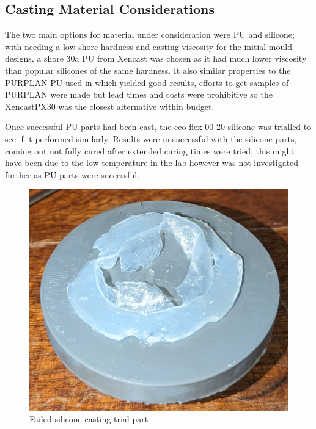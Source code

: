 \subsection{Casting Material Considerations}
The two main options for material under consideration were \gls{PU} and silicone; with needing a low shore hardness and casting viscosity for the initial mould designs, a shore 30a \gls{PU} from Xencast was chosen as it had much lower viscosity than popular silicones of the same hardness. It also similar properties to the PURPLAN \gls{PU} used in  which yielded good results, efforts to get samples of PURPLAN were made but lead times and costs were prohibitive so the XencastPX30 was the closest alternative within budget.


Once successful \gls{PU} parts had been cast, the eco-flex 00-20 silicone was trialled to see if it performed similarly. Results were unsuccessful with the silicone parts, coming out not fully cured after extended curing times were tried, this might have been due to the low temperature in the lab however was not investigated further as \gls{PU} parts were successful.

\begin{figure}
    \centering
    \footnotesize
    \includegraphics[width=0.6\linewidth]{figures/silicast}
    \caption{Failed silicone casting trial part}
    \label{fig:sil}
\end{figure}

